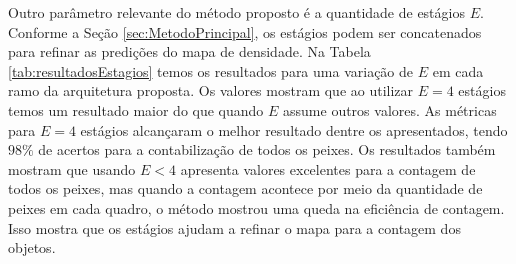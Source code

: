 Outro parâmetro relevante do método proposto é a quantidade de estágios $E$.
Conforme a Seção \ref{sec:MetodoPrincipal}, os estágios podem ser concatenados para refinar as predições do mapa de densidade. Na Tabela \ref{tab:resultadosEstagios} temos os resultados para uma variação de $E$ em cada ramo da arquitetura proposta. 
Os valores mostram que ao utilizar $E = 4$ estágios temos um resultado maior do que quando $E$ assume outros valores. 
As métricas para $E = 4$ estágios alcançaram o melhor resultado dentre os apresentados, tendo $98\%$ de acertos para a contabilização de todos os peixes.
Os resultados também mostram que usando $E < 4$ apresenta valores excelentes para a contagem de todos os peixes, mas quando a contagem acontece por meio da quantidade de peixes em cada quadro, o método mostrou uma queda na eficiência de contagem. 
Isso mostra que os estágios ajudam a refinar o mapa para a contagem dos objetos.

